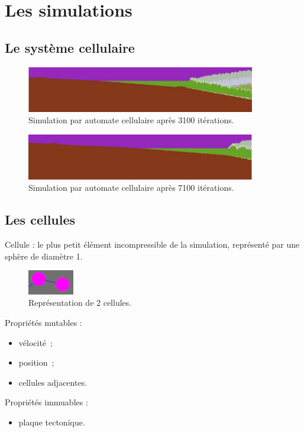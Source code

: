 \documentclass{beamer}
\begin{document}
\section{Les simulations}
\subsection{Le système cellulaire}
\begin{frame}
  \begin{center}
    \begin{figure}
      \includegraphics[width=10cm]{Images/3100_cell.png}
      \caption{Simulation par automate cellulaire après 3100 itérations.}
    \end{figure}
    \begin{figure}
      \includegraphics[width=10cm]{Images/7100_cell.png}
      \caption{Simulation par automate cellulaire après 7100 itérations.}
    \end{figure}
  \end{center}
\end{frame}

\subsection{Les cellules}
\begin{frame}
  Cellule : le plus petit élément incompressible de la simulation, représenté par une sphère de diamètre 1. \smallbreak
  \begin{figure}
    \begin{center}
      \includegraphics[width=2cm]{Images/cellule.png}
    \end{center}
    \caption{Représentation de 2 cellules.}
  \end{figure}
  Propriétés mutables :
  \begin{itemize}
   \item vélocité~;
   \item position~;
   \item cellules adjacentes.
  \end{itemize}
  Propriétés immuables :
  \begin{itemize}
   \item plaque tectonique.
  \end{itemize}
\end{frame}
\end{document}
